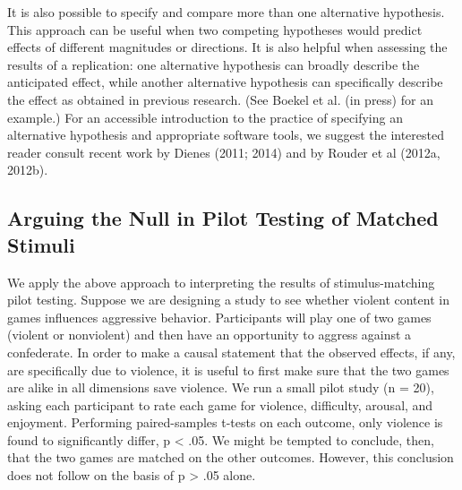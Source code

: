 \documentclass{article}
\begin{document}
It is also possible to specify and compare more than one alternative hypothesis. This approach can be useful when two competing hypotheses would predict effects of different magnitudes or directions. It is also helpful when assessing the results of a replication: one alternative hypothesis can broadly describe the anticipated effect, while another alternative hypothesis can specifically describe the effect as obtained in previous research. (See Boekel et al. (in press) for an example.)  For an accessible introduction to the practice of specifying an alternative hypothesis and appropriate software tools, we suggest the interested reader consult recent work by Dienes (2011; 2014) and by Rouder et al (2012a, 2012b).

\subsection{Arguing the Null in Pilot Testing of Matched Stimuli}
We apply the above approach to interpreting the results of stimulus-matching pilot testing.  Suppose we are designing a study to see whether violent content in games influences aggressive behavior. Participants will play one of two games (violent or nonviolent) and then have an opportunity to aggress against a confederate. In order to make a causal statement that the observed effects, if any, are specifically due to violence, it is useful to first make sure that the two games are alike in all dimensions save violence. We run a small pilot study (n = 20), asking each participant to rate each game for violence, difficulty, arousal, and enjoyment. Performing paired-samples t-tests on each outcome, only violence is found to significantly differ, p < .05. We might be tempted to conclude, then, that the two games are matched on the other outcomes. However, this conclusion does not follow on the basis of p > .05 alone.
\end{document}
